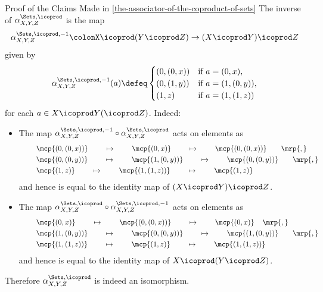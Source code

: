 \begin{Proof}{Proof of the Claims Made in \cref{the-associator-of-the-coproduct-of-sets}}
    The inverse of $\alpha^{\Sets,\icoprod}_{X,Y,Z}$ is the map
    \[
        \alpha^{\Sets,\icoprod,-1}_{X,Y,Z}%
        \colon%
        X\icoprod(Y\icoprod Z)%
        \to%
        (X\icoprod Y)\icoprod Z%
    \]%
    given by
    \begin{align*}
        \alpha^{\Sets,\icoprod,-1}_{X,Y,Z}(a)%
        \defeq%
        \begin{cases}
            (0,(0,x)) &\text{if $a=(0,x)$,}\\
            (0,(1,y)) &\text{if $a=(1,(0,y))$,}\\
            (1,z)     &\text{if $a=(1,(1,z))$}
        \end{cases}
    \end{align*}
    for each $a\in X\icoprod Y(\icoprod Z)$. Indeed:
    \begin{itemize}
        \item{}The map $\alpha^{\Sets,\icoprod,-1}_{X,Y,Z}\circ\alpha^{\Sets,\icoprod}_{X,Y,Z}$ acts on elements as
            \begin{align*}
                &\mkern40mu\mcp{(0,(0,x))}\mkern40mu \mapsto \mkern40mu\mcp{(0,x)}    \mkern40mu \mapsto \mkern40mu\mcp{(0,(0,x))}\mkern35mu\mrp{,}\\
                &\mkern40mu\mcp{(0,(0,y))}\mkern40mu \mapsto \mkern40mu\mcp{(1,(0,y))}\mkern40mu \mapsto \mkern40mu\mcp{(0,(0,y))}\mkern35mu\mrp{,}\\
                &\mkern40mu\mcp{(1,z)}\mkern40mu     \mapsto \mkern40mu\mcp{(1,(1,z))}\mkern40mu \mapsto \mkern40mu\mcp{(1,z)}
            \end{align*}
            and hence is equal to the identity map of $(X\icoprod Y)\icoprod Z$.
        \item{}The map $\alpha^{\Sets,\icoprod}_{X,Y,Z}\circ\alpha^{\Sets,\icoprod,-1}_{X,Y,Z}$ acts on elements as
            \begin{align*}
                &\mkern40mu\mcp{(0,x)}\mkern40mu     \mapsto \mkern40mu\mcp{(0,(0,x))}\mkern40mu \mapsto \mkern40mu\mcp{(0,x)}\mkern20mu\mrp{,}\\
                &\mkern40mu\mcp{(1,(0,y))}\mkern40mu \mapsto \mkern40mu\mcp{(0,(0,y))}\mkern40mu \mapsto \mkern40mu\mcp{(1,(0,y))}\mkern35mu\mrp{,}\\
                &\mkern40mu\mcp{(1,(1,z))}\mkern40mu \mapsto \mkern40mu\mcp{(1,z)}\mkern40mu     \mapsto \mkern40mu\mcp{(1,(1,z))}\mkern40mu
            \end{align*}
            and hence is equal to the identity map of $X\icoprod(Y\icoprod Z)$.
    \end{itemize}
    Therefore $\alpha^{\Sets,\icoprod}_{X,Y,Z}$ is indeed an isomorphism.


\end{Proof}
